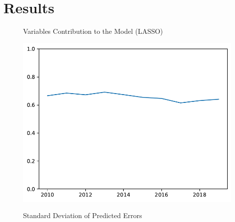 \section{Results}



\begin{figure}[H]
    \centering
    \caption{Variables Contribution to the Model (LASSO)}
    \label{fig:enter-label}
\end{figure}


\begin{figure}[H]
    \centering
    \caption{Standard Deviation of Predicted Errors}
    \includegraphics[width=1\textwidth]{../figures/std_trend.pdf}
    \label{fig:enter-label}
\end{figure}




